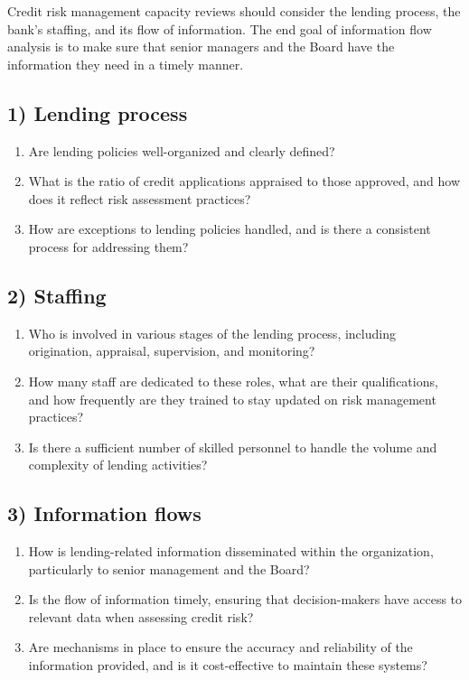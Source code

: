 
Credit risk management capacity reviews should consider the lending process, the
bank's staffing, and its flow of information. The end goal of information flow
analysis is to make sure that senior managers and the Board have the information
they need in a timely manner.

\subsection*{1) Lending process}
\begin{enumerate}[label=\alph*)]
\item Are lending policies well-organized and clearly defined?
\item What is the ratio of credit applications appraised to those approved, and
how does it reflect risk assessment practices?
\item How are exceptions to lending policies handled, and is there a consistent
process for addressing them?
\end{enumerate}

\subsection*{2) Staffing}
\begin{enumerate}[label=\alph*)]
\item Who is involved in various stages of the lending process, including
origination, appraisal, supervision, and monitoring?
\item How many staff are dedicated to these roles, what are their
qualifications, and how frequently are they trained to stay updated on risk
management practices?
\item Is there a sufficient number of skilled personnel to handle the volume and
complexity of lending activities?
\end{enumerate}

\subsection*{3) Information flows}
\begin{enumerate}[label=\alph*)]
\item How is lending-related information disseminated within the organization,
particularly to senior management and the Board?
\item Is the flow of information timely, ensuring that decision-makers have
access to relevant data when assessing credit risk?
\item Are mechanisms in place to ensure the accuracy and reliability of the
information provided, and is it cost-effective to maintain these systems?
\end{enumerate}
